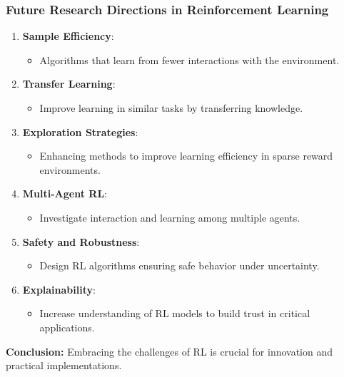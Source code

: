 \documentclass[aspectratio=169]{beamer}
\begin{document}
\begin{frame}[fragile]
    \frametitle{Future Research Directions in Reinforcement Learning}
    \begin{enumerate}
        \item \textbf{Sample Efficiency}:
        \begin{itemize}
            \item Algorithms that learn from fewer interactions with the environment.
        \end{itemize}
        
        \item \textbf{Transfer Learning}:
        \begin{itemize}
            \item Improve learning in similar tasks by transferring knowledge.
        \end{itemize}
        
        \item \textbf{Exploration Strategies}:
        \begin{itemize}
            \item Enhancing methods to improve learning efficiency in sparse reward environments.
        \end{itemize}
        
        \item \textbf{Multi-Agent RL}:
        \begin{itemize}
            \item Investigate interaction and learning among multiple agents.
        \end{itemize}
        
        \item \textbf{Safety and Robustness}:
        \begin{itemize}
            \item Design RL algorithms ensuring safe behavior under uncertainty.
        \end{itemize}
        
        \item \textbf{Explainability}:
        \begin{itemize}
            \item Increase understanding of RL models to build trust in critical applications.
        \end{itemize}
    \end{enumerate}

    \textbf{Conclusion:} Embracing the challenges of RL is crucial for innovation and practical implementations.
\end{frame}
\end{document}
